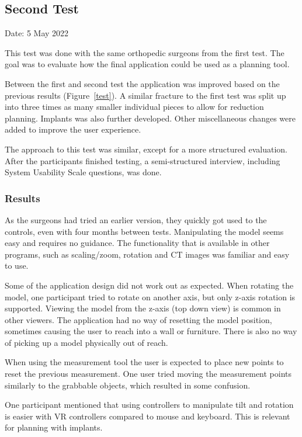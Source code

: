 \documentclass[a4paper]{report}
\begin{document}
\subsection{Second Test}
Date: 5 May 2022

This test was done with the same orthopedic surgeons from the first test.
The goal was to evaluate how the final application could be used as a planning tool.

Between the first and second test the application was improved based on the previous results (Figure~\ref{test}).
A similar fracture to the first test was split up into three times as many smaller individual pieces to allow for reduction planning.
Implants was also further developed.
Other miscellaneous changes were added to improve the user experience.

The approach to this test was similar, except for a more structured evaluation. After the participants finished testing, a semi-structured interview, including System Usability Scale questions, was done.


\subsubsection{Results}
As the surgeons had tried an earlier version, they quickly got used to the controls, even with four months between tests. 
Manipulating the model seems easy and requires no guidance. The functionality that is available in other programs, such as scaling/zoom, rotation and CT images was familiar and easy to use.

Some of the application design did not work out as expected.
When rotating the model, one participant tried to rotate on another axis, but only z-axis rotation is supported. Viewing the model from the z-axis (top down view) is common in other viewers.
The application had no way of resetting the model position, sometimes causing the user to reach into a wall or furniture. There is also no way of picking up a model physically out of reach.

When using the measurement tool the user is expected to place new points to reset the previous measurement. One user tried moving the measurement points similarly to the grabbable objects, which resulted in some confusion.

One participant mentioned that using controllers to manipulate tilt and rotation is easier with VR controllers compared to mouse and keyboard. This is relevant for planning with implants.
\end{document}
